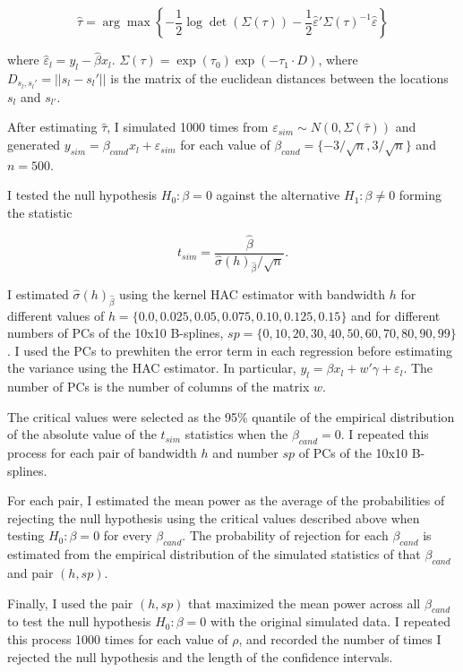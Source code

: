 \documentclass[
]{article}
\begin{document}
\[
  \hat\tau = \arg \max \left\{ -\frac{1}{2} \log\det(\Sigma(\tau))-\frac{1}{2}\hat\varepsilon'\Sigma(\tau)^{-1}\hat\varepsilon \right\}
\]

where \(\hat\varepsilon_l = y_l - \hat\beta x_l\).
\(\Sigma(\tau)=\exp(\tau_0)\exp(-\tau_1\cdot D)\), where
\(D_{s_l,s_l'}=||s_l - s_l'||\) is the matrix of the euclidean distances
between the locations \(s_l\) and \(s_{l'}\).

After estimating \(\hat\tau\), I simulated 1000 times from
\(\varepsilon_{sim} \sim N(0,\Sigma(\hat\tau))\) and generated
\(y_{sim }= \beta_{cand} x_l  + \varepsilon_{sim}\) for each value of
\(\beta_{cand} = \{-3/\sqrt{n}, 3/\sqrt{n}\}\) and \(n=500\).

I tested the null hypothesis \(H_0: \beta = 0\) against the alternative
\(H_1: \beta \not= 0\) forming the statistic

\[
t_{sim} = \frac{\hat\beta}{\hat\sigma(h)_{\hat\beta}/\sqrt{n}}.
\]

I estimated \(\hat\sigma(h)_{\hat\beta}\) using the kernel HAC estimator
with bandwidth \(h\) for different values of
\(h=\{0.0, 0.025, 0.05, 0.075, 0.10, 0.125, 0.15\}\) and for different
numbers of PCs of the 10x10 B-splines,
\(sp = \{0, 10, 20, 30, 40, 50, 60, 70, 80, 90, 99\}\). I used the PCs
to prewhiten the error term in each regression before estimating the
variance using the HAC estimator. In particular,
\(y_l=\beta x_l + w'\gamma+\varepsilon_l\). The number of PCs is the
number of columns of the matrix \(w\).

The critical values were selected as the 95\% quantile of the empirical
distribution of the absolute value of the \(t_{sim}\) statistics when
the \(\beta_{cand} = 0\). I repeated this process for each pair of
bandwidth \(h\) and number \(sp\) of PCs of the 10x10 B-splines.

For each pair, I estimated the mean power as the average of the
probabilities of rejecting the null hypothesis using the critical values
described above when testing \(H_0: \beta = 0\) for every
\(\beta_{cand}\). The probability of rejection for each \(\beta_{cand}\)
is estimated from the empirical distribution of the simulated statistics
of that \(\beta_{cand}\) and pair \((h,sp)\).

Finally, I used the pair \((h,sp)\) that maximized the mean power across
all \(\beta_{cand}\) to test the null hypothesis \(H_0: \beta = 0\) with
the original simulated data. I repeated this process 1000 times for each
value of \(\rho\), and recorded the number of times I rejected the null
hypothesis and the length of the confidence intervals.
\end{document}
